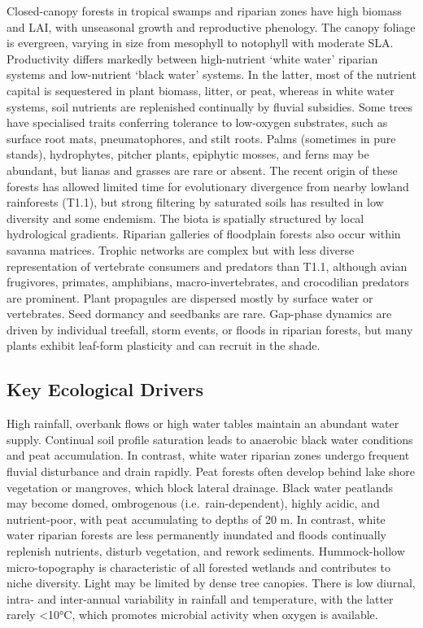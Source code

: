 \documentclass[
  letterpaper,
  DIV=11,
  numbers=noendperiod]{scrartcl}
\begin{document}
Closed-canopy forests in tropical swamps and riparian zones have high
biomass and LAI, with unseasonal growth and reproductive phenology. The
canopy foliage is evergreen, varying in size from mesophyll to notophyll
with moderate SLA. Productivity differs markedly between high-nutrient
`white water' riparian systems and low-nutrient `black water' systems.
In the latter, most of the nutrient capital is sequestered in plant
biomass, litter, or peat, whereas in white water systems, soil nutrients
are replenished continually by fluvial subsidies. Some trees have
specialised traits conferring tolerance to low-oxygen substrates, such
as surface root mats, pneumatophores, and stilt roots. Palms (sometimes
in pure stands), hydrophytes, pitcher plants, epiphytic mosses, and
ferns may be abundant, but lianas and grasses are rare or absent. The
recent origin of these forests has allowed limited time for evolutionary
divergence from nearby lowland rainforests (T1.1), but strong filtering
by saturated soils has resulted in low diversity and some endemism. The
biota is spatially structured by local hydrological gradients. Riparian
galleries of floodplain forests also occur within savanna matrices.
Trophic networks are complex but with less diverse representation of
vertebrate consumers and predators than T1.1, although avian frugivores,
primates, amphibians, macro-invertebrates, and crocodilian predators are
prominent. Plant propagules are dispersed mostly by surface water or
vertebrates. Seed dormancy and seedbanks are rare. Gap-phase dynamics
are driven by individual treefall, storm events, or floods in riparian
forests, but many plants exhibit leaf-form plasticity and can recruit in
the shade.

\subsection{Key Ecological Drivers}\label{key-ecological-drivers-103}

High rainfall, overbank flows or high water tables maintain an abundant
water supply. Continual soil profile saturation leads to anaerobic black
water conditions and peat accumulation. In contrast, white water
riparian zones undergo frequent fluvial disturbance and drain rapidly.
Peat forests often develop behind lake shore vegetation or mangroves,
which block lateral drainage. Black water peatlands may become domed,
ombrogenous (i.e.~rain-dependent), highly acidic, and nutrient-poor,
with peat accumulating to depths of 20 m. In contrast, white water
riparian forests are less permanently inundated and floods continually
replenish nutrients, disturb vegetation, and rework sediments.
Hummock-hollow micro-topography is characteristic of all forested
wetlands and contributes to niche diversity. Light may be limited by
dense tree canopies. There is low diurnal, intra- and inter-annual
variability in rainfall and temperature, with the latter rarely
\textless10°C, which promotes microbial activity when oxygen is
available.
\end{document}
